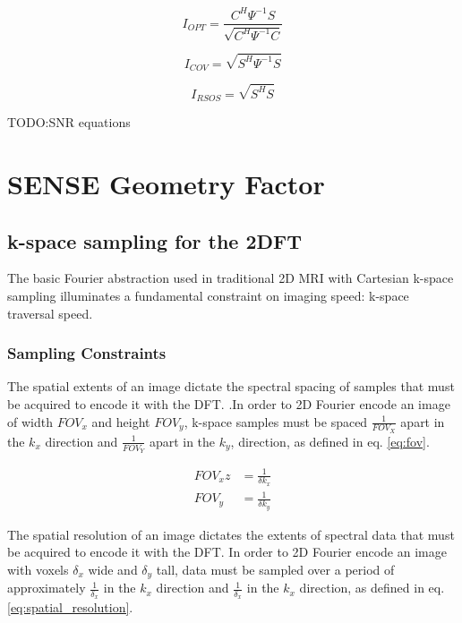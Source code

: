 \begin{equation} \label{eq:I_OPT}
I_{OPT}=\frac{C^H\Psi^{-1}S}{\sqrt{C^H\Psi^{-1}C}}
\end{equation}

\begin{equation} \label{eq:I_COV}
I_{COV}=\sqrt{S^H\Psi^{-1}S}
\end{equation}

\begin{equation} \label{eq:I_RSOS}
I_{RSOS}=\sqrt{S^{H} S}
\end{equation}

TODO:SNR equations

\section{SENSE Geometry Factor}

\subsection{k-space sampling for the 2DFT}
The basic Fourier abstraction used in traditional 2D MRI with Cartesian k-space sampling illuminates a fundamental
constraint on imaging speed: k-space traversal speed.

\subsubsection{Sampling Constraints}
The spatial extents of an image dictate the spectral spacing of samples that must be acquired to encode it with the DFT.
\cite{nishimura} .In order to 2D Fourier encode an image of width $FOV_x$ and height $FOV_y$, k-space samples must be
spaced $\frac{1}{FOV_X}$ apart in the $k_x$ direction and $\frac{1}{FOV_Y}$ apart in the $k_y$, direction, as defined in
eq. \ref{eq:fov}.

\begin{equation}\label{eq:fov}
    \begin{aligned}
        FOV_x z &= \frac{1}{\delta k_x}\\
        FOV_y &= \frac{1}{\delta k_y}
    \end{aligned}
\end{equation}

The spatial resolution of an image dictates the extents of spectral data that must be acquired to encode it with the
DFT. In order to 2D Fourier encode an image with voxels $\delta_x$ wide and $\delta_y$ tall, data must be sampled over a
period of approximately $\frac{1}{\delta_x}$ in the $k_x$ direction and $\frac{1}{\delta_x}$ in the $k_x$ direction, as
defined in eq. \ref{eq:spatial_resolution}.


